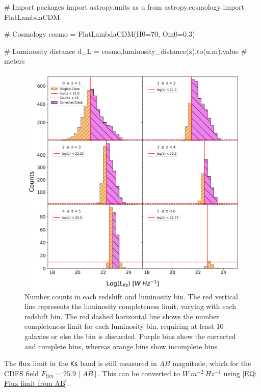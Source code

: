 \vspace{12pt}
\begin{python}
    # Import packages
    import astropy.units as u
    from astropy.cosmology import FlatLambdaCDM 
    
    # Cosmology
    cosmo = FlatLambdaCDM(H0=70, Om0=0.3)
    
    # Luminosity distance
    d_L = cosmo.luminosity_distance(z).to(u.m).value # meters
\end{python}

\begin{figure}[ht!]
    \centering
    \includegraphics[width=\linewidth]{Figures/Spectral Luminosity Counts.png}
    \caption{Number counts in each redshift and luminosity bin. The red vertical line represents the luminosity completeness limit, varying with each redshift bin. The red dashed horizontal line shows the number completeness limit for each luminosity bin, requiring at least 10 galaxies or else the bin is discarded. Purple bins show the corrected and complete bins, whereas orange bins show incomplete bins.}
    \label{fig: Spectral Luminosity Counts}
\end{figure}

The flux limit in the \texttt{Ks} band is still measured in $AB$ magnitude, which for the CDFS field $F_{lim}=25.9\ [AB]$. This can be converted to $W\ m^{-2}\ Hz^{-1}$ using \cref{EQ: Flux limit from AB}. 

